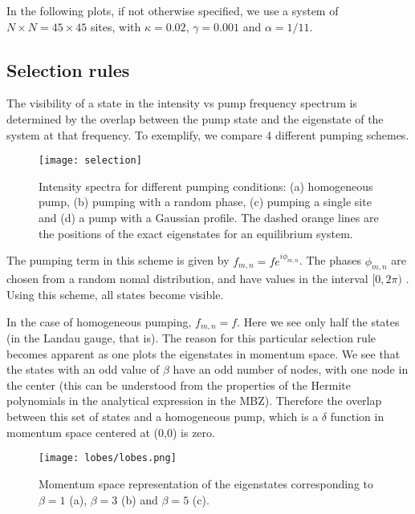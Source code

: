 \documentclass[twocolumn, 10pt, aps, superscriptaddress, floatfix, showpacs, prb, citeautoscript]{revtex4-1}
\newcommand{\co}[2]{#2}
\renewcommand{\paragraph}{\co}
\begin{document}
In the following plots, if not otherwise specified, we use a system of $N \times N = 45 \times 45$ sites, with $\kappa =
0.02$, $\gamma = 0.001$ and $\alpha = 1/11$.

\subsection{Selection rules}
\label{sec:selection}

The visibility of a state in the intensity vs pump frequency spectrum
is determined by the overlap between the pump state and the eigenstate
of the system at that frequency.  To exemplify, we compare 4 different
pumping schemes.

\begin{figure}[htb]
  \centerline{\texttt{[image: selection]}}
  \caption{Intensity spectra for different pumping conditions: (a)
    homogeneous pump, (b) pumping with a random phase, (c) pumping a
    single site and (d) a pump with a Gaussian profile. The dashed
    orange lines are the positions of the exact eigenstates for an
    equilibrium system.}
  \label{fig:pumping_schemes}
\end{figure}



\paragraph{Random phase}
The pumping term in this scheme is given by
$f_{m,n}=fe^{i\phi_{m,n}}$. The phases $\phi_{m,n}$ are chosen
from a random nomal distribution, and have values in the interval
$[0,2\pi)$ . Using this scheme, all states become visible.

\paragraph{Homogeneous pumping}
In the case of homogeneous pumping, $f_{m,n} = f$. Here we see only
half the states (in the Landau gauge, that is). The reason for this
particular selection rule becomes apparent as one plots the
eigenstates in momentum space. We see that the states with an odd
value of $\beta$ have an odd number of nodes, with one node in the
center (this can be understood from the properties of the Hermite
polynomials in the analytical expression in the MBZ). Therefore the
overlap between this set of states and a homogeneous pump, which is a
$\delta$ function in momentum space centered at (0,0) is zero.

\begin{figure}[htb]
  \centerline{\texttt{[image: lobes/lobes.png]}}
  \caption{Momentum space representation of the eigenstates
    corresponding to $\beta=1$ (a), $\beta=3$ (b) and $\beta=5$ (c).}
  \label{fig:hom_mom_sp}
\end{figure}
\end{document}
